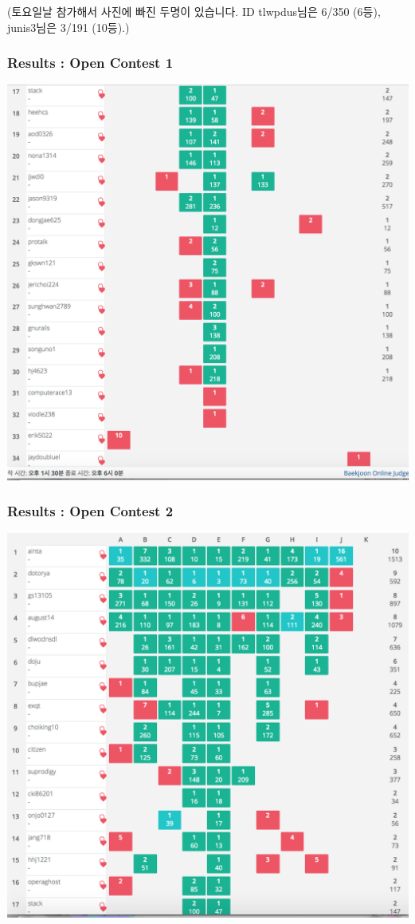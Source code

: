 \documentclass{beamer}
\begin{document}
	\begin{frame}
(토요일날 참가해서 사진에 빠진 두명이 있습니다. ID tlwpdus님은 6/350 (6등), junis3님은 3/191 (10등).)
	\frametitle{Results : Open Contest 1}
	\begin{center}
		\includegraphics[scale=0.22]{IMG_3.png}
	\end{center}
\end{frame}

\begin{frame}
	\frametitle{Results : Open Contest 2}
	\begin{center}
		\includegraphics[scale=0.31]{IMG_4.png}
	\end{center}
\end{frame}
\end{document}

